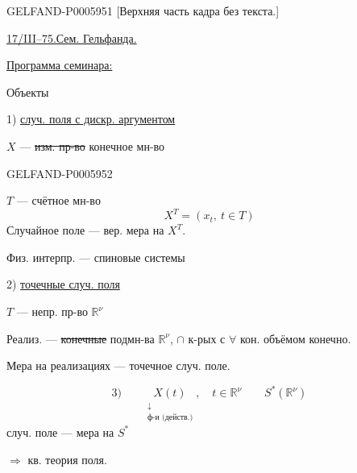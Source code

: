 \begin{GelfandAdjacentEvidence}{GELFAND-P000595}{1}
[Верхняя часть кадра без текста.]

\underline{\underline{17/III--75.}}\qquad \underline{Сем. Гельфанда.}

\underline{Программа семинара:}


Объекты

1) \underline{случ. поля с дискр. аргументом}

\(X\) — \sout{изм. пр-во} конечное мн-во
\end{GelfandAdjacentEvidence}
\begin{GelfandAdjacentEvidence}{GELFAND-P000595}{2}

\(T\) — счётное мн-во
\[
X^T=(x_t,\ t\in T)
\]
Случайное поле — вер. мера на \(X^T\).

Физ. интерпр. — спиновые системы

2) \underline{точечные случ. поля}

\(T\) — непр. пр-во \(\mathbb R^\nu\)

Реализ. — \sout{конечные} подмн-ва \(\mathbb R^\nu\),
\(\cap\) к-рых с \(\forall\) кон. объёмом конечно.
\end{GelfandAdjacentEvidence}


Мера на реализациях — точечное случ. поле.

\[
3)\qquad
\underset{\substack{\downarrow\\\text{ф-и (действ.)}}}{X(t)},\quad
t\in\mathbb R^\nu\qquad S^*(\mathbb R^\nu)
\]
случ. поле — мера на \(S^*\)

\(\Rightarrow\) кв. теория поля.


